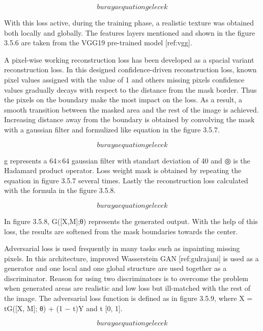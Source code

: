 \begin{equation}
    buraya equation gelecek
\end{equation}

With this loss active, during the training phase, a realistic texture was obtained both locally and globally. The features layers mentioned and shown in the figure 3.5.6 are taken from the VGG19 pre-trained model [ref:vgg].

A pixel-wise working reconstruction loss has been developed as a spacial variant reconstruction loss. In this designed confidence-driven reconstruction loss, known pixel values assigned with the value of 1 and others missing pixels confidence values gradually decays with respect to the distance from the mask border. Thus the pixels on the boundary make the most impact on the loss. As a result, a smooth transition between the masked area and the rest of the image is achieved. Increasing distance away from the boundary is obtained by convolving the mask with a gaussian filter and formulized like equation in the figure 3.5.7.

\begin{equation}
    buraya equation gelecek
\end{equation}

g represents a 64×64 gaussian filter with standart deviation of 40 and ◎ is the Hadamard product operator. Loss weight mask  is obtained by repeating the equation in figure 3.5.7 several times. Lastly the reconstruction loss calculated with the formula in the figure 3.5.8.

\begin{equation}
    buraya equation gelecek
\end{equation}

In figure 3.5.8, G([X,M];θ) represents the generated output. With the help of this loss, the results are softened from the mask boundaries towards the center.

Adversarial loss is used frequently in many tasks such as inpainting missing pixels. In this architecture, improved Wasserstein GAN [ref:gulrajani] is used as a generator and one local and one global structure are used together as a discriminator. Reason for using two discriminators is to overcome the problem when generated areas are realistic and low loss but ill-matched with the rest of the image. The adversarial loss function is defined as in figure 3.5.9, where X = tG([X, M]; θ) + (1 − t)Y and t  [0, 1].

\begin{equation}
    buraya equation gelecek
\end{equation}

